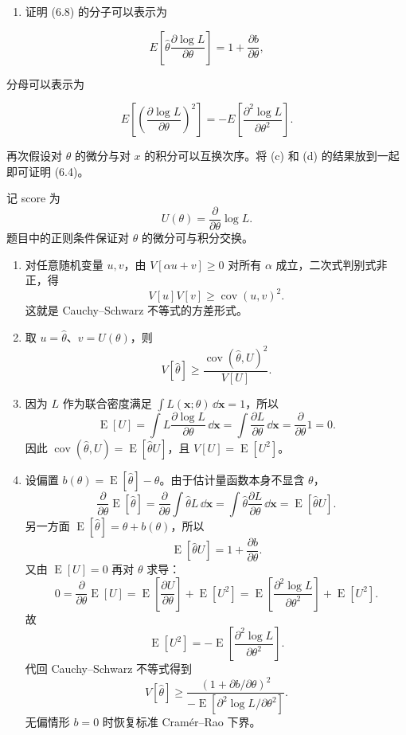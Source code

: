 \begin{question}
\begin{enumerate}[start=4]
\item
  证明 (6.8) 的分子可以表示为
\end{enumerate}

\[
E\left[\hat\theta\frac{\partial\log L}{\partial\theta}\right]=1+\frac{\partial b}{\partial\theta},
\]

分母可以表示为

\[
E\left[\left(\frac{\partial\log L}{\partial\theta}\right)^2\right]
=-E\left[\frac{\partial^2\log L}{\partial\theta^2}\right].
\]

再次假设对 \(\theta\) 的微分与对 \(x\) 的积分可以互换次序。将 (c) 和 (d)
的结果放到一起即可证明 (6.4)。
\begin{solution}
记 score 为
\[
U(\theta)=\frac{\partial}{\partial\theta}\log L.
\]
题目中的正则条件保证对 \(\theta\) 的微分可与积分交换。

\begin{enumerate}
\item 对任意随机变量 \(u,v\)，由
\(V[\alpha u+v]\ge0\) 对所有 \(\alpha\) 成立，二次式判别式非正，得
\[
V[u]V[v]\ge\operatorname{cov}(u,v)^2.
\]
这就是 Cauchy--Schwarz 不等式的方差形式。

\item 取 \(u=\hat\theta\)、\(v=U(\theta)\)，则
\[
V[\hat\theta]\ge
\frac{\operatorname{cov}(\hat\theta,U)^2}{V[U]}.
\]

\item 因为 \(L\) 作为联合密度满足 \(\int L(\mathbf x;\theta)\,\dd{\mathbf x}=1\)，所以
\[
\operatorname{E}[U]=\int L\frac{\partial\log L}{\partial\theta}\,\dd{\mathbf x}
=\int\frac{\partial L}{\partial\theta}\,\dd{\mathbf x}
=\frac{\partial}{\partial\theta}1=0.
\]
因此 \(\operatorname{cov}(\hat\theta,U)=\operatorname{E}[\hat\theta U]\)，且
\(V[U]=\operatorname{E}[U^2]\)。

\item 设偏置 \(b(\theta)=\operatorname{E}[\hat\theta]-\theta\)。由于估计量函数本身不显含
\(\theta\)，
\[
\frac{\partial}{\partial\theta}\operatorname{E}[\hat\theta]
=\frac{\partial}{\partial\theta}\int\hat\theta L\,\dd{\mathbf x}
=\int\hat\theta\frac{\partial L}{\partial\theta}\,\dd{\mathbf x}
=\operatorname{E}[\hat\theta U].
\]
另一方面 \(\operatorname{E}[\hat\theta]=\theta+b(\theta)\)，所以
\[
\operatorname{E}[\hat\theta U]=1+\frac{\partial b}{\partial\theta}.
\]
又由 \(\operatorname{E}[U]=0\) 再对 \(\theta\) 求导：
\[
0=\frac{\partial}{\partial\theta}\operatorname{E}[U]
=\operatorname{E}\left[\frac{\partial U}{\partial\theta}\right]+\operatorname{E}[U^2]
=\operatorname{E}\left[\frac{\partial^2\log L}{\partial\theta^2}\right]+\operatorname{E}[U^2].
\]
故
\[
\operatorname{E}[U^2]=-\operatorname{E}\left[\frac{\partial^2\log L}{\partial\theta^2}\right].
\]
代回 Cauchy--Schwarz 不等式得到
\[
V[\hat\theta]
\ge
\frac{\left(1+\partial b/\partial\theta\right)^2}
{-\operatorname{E}\left[\partial^2\log L/\partial\theta^2\right]}.
\]
 无偏情形 \(b=0\) 时恢复标准 Cram\'{e}r--Rao 下界。
\end{enumerate}
\end{solution}
\end{question}


